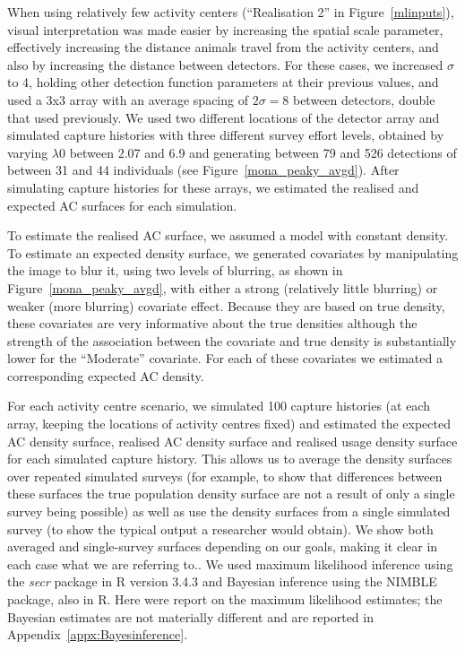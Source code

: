 \documentclass[10pt,a4paper]{article}
\begin{document}
When using relatively few activity centers (``Realisation 2'' in Figure~\ref{mlinputs}), visual interpretation was made easier by increasing the spatial scale parameter, effectively increasing the distance animals travel from the activity centers, and also by increasing the distance between detectors. For these cases, we increased $\sigma$ to 4, holding other detection function parameters at their previous values, and used a 3x3 array with an average spacing of $2\sigma=8$ between detectors, double that used previously. We used two different locations of the detector array and simulated capture histories with three different survey effort levels, obtained by varying $\lambda0$ between 2.07 and 6.9 and generating between 79 and 526 detections of between 31 and 44 individuals (see Figure~\ref{mona_peaky_avgd}). After simulating capture histories for these arrays, we estimated the realised and expected AC surfaces for each simulation. 

To estimate the realised AC surface, we assumed a model with constant density. To estimate an expected density surface, we generated covariates by manipulating the image to  blur it, using two levels of blurring, as shown in Figure~\ref{mona_peaky_avgd}, with either a strong (relatively little blurring) or weaker (more blurring) covariate effect. Because they are based on true density, these covariates are very informative about the true densities although the strength of the association between the covariate and true density is substantially lower for the ``Moderate'' covariate. For each of these covariates we estimated a corresponding expected AC density.

For each activity centre scenario, we simulated 100 capture histories (at each array, keeping the locations of activity centres fixed) and estimated the expected AC density surface, realised AC density surface and realised usage density surface for each simulated capture history. This allows us to average the density surfaces over repeated simulated surveys (for example, to show that differences between these surfaces the true population density surface are not a result of only a single survey being possible) as well as use the density surfaces from a single simulated survey (to show the typical output a researcher would obtain). We show both averaged and single-survey surfaces depending on our goals, making it clear in each case what we are referring to.. We used maximum likelihood inference using the {\it secr} package in R version 3.4.3 and Bayesian inference using the NIMBLE package, also in R. Here were report on the maximum likelihood estimates; the Bayesian estimates are not materially different and are reported in Appendix~\ref{appx:Bayesinference}.
\end{document}
